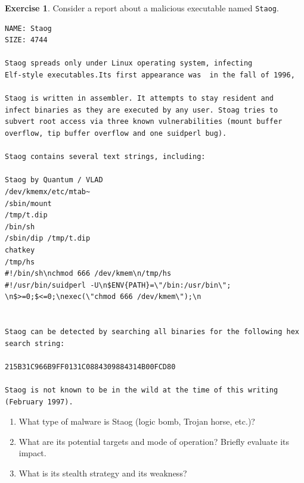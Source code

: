 \documentclass[a4paper,11pt]{article}
\theoremstyle{plain}
\theoremstyle{definition}
\newtheorem{exercice}{Exercise}
\begin{document}
\begin{exercice}
Consider a report about a malicious executable named \texttt{Staog}.
\begin{verbatim}
NAME: Staog
SIZE: 4744

Staog spreads only under Linux operating system, infecting
Elf-style executables.Its first appearance was  in the fall of 1996,

Staog is written in assembler. It attempts to stay resident and
infect binaries as they are executed by any user. Stoag tries to
subvert root access via three known vulnerabilities (mount buffer
overflow, tip buffer overflow and one suidperl bug).

Staog contains several text strings, including:

Staog by Quantum / VLAD
/dev/kmemx/etc/mtab~
/sbin/mount
/tmp/t.dip
/bin/sh
/sbin/dip /tmp/t.dip
chatkey
/tmp/hs
#!/bin/sh\nchmod 666 /dev/kmem\n/tmp/hs
#!/usr/bin/suidperl -U\n$ENV{PATH}=\"/bin:/usr/bin\";
\n$>=0;$<=0;\nexec(\"chmod 666 /dev/kmem\");\n


Staog can be detected by searching all binaries for the following hex
search string:

215B31C966B9FF0131C0884309884314B00FCD80

Staog is not known to be in the wild at the time of this writing
(February 1997).
\end{verbatim}

\begin{enumerate}
\item What type of malware is Staog (logic bomb, Trojan horse, etc.)?
\item What are its potential targets and mode of operation? Briefly evaluate its impact.
\item What is its stealth strategy and its weakness?
\end{enumerate}

\end{exercice}
\end{document}

